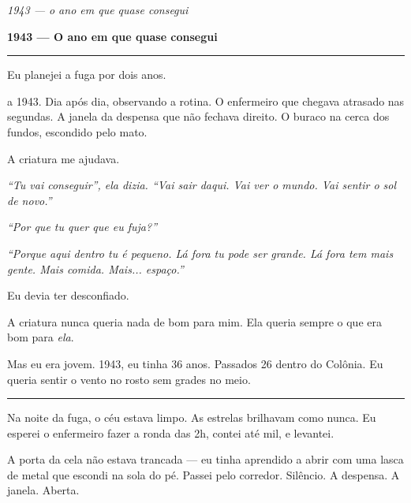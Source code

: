 
\noindent \textit{1943 --- o ano em que quase consegui}

\noindent \textbf{1943 --- O ano em que quase consegui}

\vspace{0.5em}\noindent\rule{\textwidth}{0.5pt}\vspace{0.5em}

\noindent Eu planejei a fuga por dois anos.

 a 1943. Dia após dia, observando a rotina. O enfermeiro que chegava atrasado nas segundas. A janela da despensa que não fechava direito. O buraco na cerca dos fundos, escondido pelo mato.

\noindent A criatura me ajudava.

\noindent \textit{\textquotedblleft{}Tu vai conseguir\textquotedblright{}\textit{, ela dizia. }\textquotedblleft{}Vai sair daqui. Vai ver o mundo. Vai sentir o sol de novo.\textquotedblright{}}

\noindent \textit{\textquotedblleft{}Por que tu quer que eu fuja?\textquotedblright{}}

\noindent \textit{\textquotedblleft{}Porque aqui dentro tu é pequeno. Lá fora tu pode ser grande. Lá fora tem mais gente. Mais comida. Mais... espaço.\textquotedblright{}}

\noindent Eu devia ter desconfiado.

\noindent A criatura nunca queria nada de bom para mim.
Ela queria sempre o que era bom para \textit{ela}.

\noindent Mas eu era jovem. 1943, eu tinha 36 anos. Passados 26 dentro do Colônia. Eu queria sentir o vento no rosto sem grades no meio.

\vspace{0.5em}\noindent\rule{\textwidth}{0.5pt}\vspace{0.5em}

\noindent Na noite da fuga, o céu estava limpo. As estrelas brilhavam como nunca. Eu esperei o enfermeiro fazer a ronda das 2h, contei até mil, e levantei.

\noindent A porta da cela não estava trancada --- eu tinha aprendido a abrir com uma lasca de metal que escondi na sola do pé. Passei pelo corredor. Silêncio. A despensa. A janela. Aberta.

